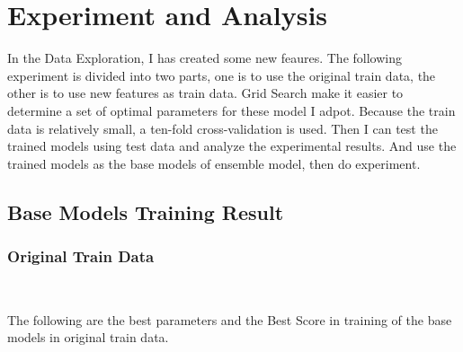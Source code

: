 \section{Experiment and Analysis}

In the Data Exploration, 
I has created some new feaures.
The following experiment is divided into two parts,
one is to use the original train data, 
the other is to use new features as train data.
Grid Search make it easier to 
determine a set of optimal parameters
for these model I adpot.
Because the train data is relatively small, 
a ten-fold cross-validation is used. 
Then I can test the trained models 
using test data and 
analyze the experimental results.
And use the trained models as 
the base models of ensemble model,
then do experiment. 

\subsection{Base Models Training Result}
\subsubsection{Original Train Data}
\

The following are the best parameters and 
the Best Score in training of 
the base models 
in original train data. 

